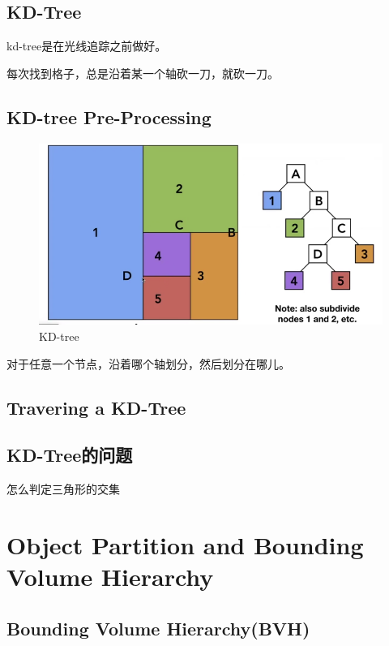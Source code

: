 \subsection*{KD-Tree}

kd-tree是在光线追踪之前做好。

每次找到格子，总是沿着某一个轴砍一刀，就砍一刀。

\subsection*{KD-tree Pre-Processing}

\begin{figure}[H]
    \centering
    \includegraphics[scale=0.4]{figures/KD-tree.png}
    \caption{KD-tree}
\end{figure}

对于任意一个节点，沿着哪个轴划分，然后划分在哪儿。

\subsection*{Travering a KD-Tree}

\subsection*{KD-Tree的问题}

怎么判定三角形的交集

\section{Object Partition and Bounding Volume Hierarchy}

\subsection*{Bounding Volume Hierarchy(BVH)}

